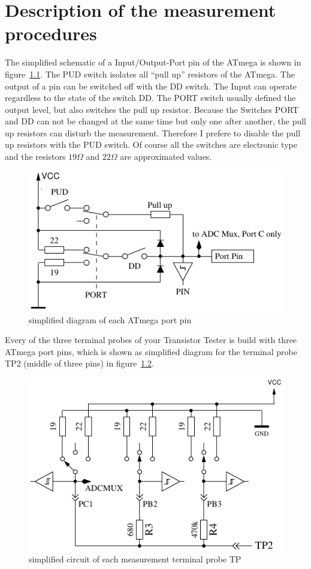 \chapter{Description of the measurement procedures}
\label{sec:measurement}
The simplified schematic of a Input/Output-Port pin of the ATmega is shown in figure~\ref{fig:port}.
The PUD switch isolates all ``pull up'' resistors of the ATmega. The output of a pin can be switched off
with the DD switch. The Input can operate regardless to the state of the switch DD.
The PORT switch usually defined the output level, but also switches the pull up resistor.
Because the Switches PORT and DD can not be changed at the same time but only one after another, the
pull up resistors can disturb the measurement. Therefore I prefere to disable the pull up resistors with the
PUD switch.
Of course all the switches are electronic type and the resistors \(19\Omega\) and \(22\Omega\) are approximated values.

\begin{figure}[H]
\centering
\includegraphics[]{../FIG/port.pdf}
\caption{simplified diagram of each ATmega port pin}
\label{fig:port}
\end{figure}

Every of the three terminal probes of your Transistor Tester is build with three ATmega port pins,
which is shown as simplified diagram for the terminal probe TP2 (middle of three pins) in figure~\ref{fig:terminal}.

\begin{figure}[H]
\centering
\includegraphics[]{../FIG/terminal.pdf}
\caption{simplified circuit of each measurement terminal probe TP}
\label{fig:terminal}
\end{figure}

